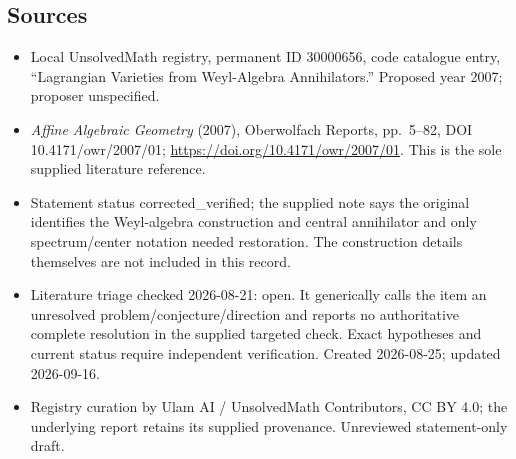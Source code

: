 \documentclass[11pt]{article}
\begin{document}
\subsection{Sources}
\begin{itemize}
\item Local UnsolvedMath registry, permanent ID 30000656, code catalogue entry, ``Lagrangian Varieties from Weyl-Algebra Annihilators.'' Proposed year 2007; proposer unspecified.
\item \emph{Affine Algebraic Geometry} (2007), Oberwolfach Reports, pp.\ 5--82, DOI 10.4171/owr/2007/01; \url{https://doi.org/10.4171/owr/2007/01}. This is the sole supplied literature reference.
\item Statement status corrected\_verified; the supplied note says the original identifies the Weyl-algebra construction and central annihilator and only spectrum/center notation needed restoration. The construction details themselves are not included in this record.
\item Literature triage checked 2026-08-21: open. It generically calls the item an unresolved problem/conjecture/direction and reports no authoritative complete resolution in the supplied targeted check. Exact hypotheses and current status require independent verification. Created 2026-08-25; updated 2026-09-16.
\item Registry curation by Ulam AI / UnsolvedMath Contributors, CC BY 4.0; the underlying report retains its supplied provenance. Unreviewed statement-only draft.
\end{itemize}
\end{document}
